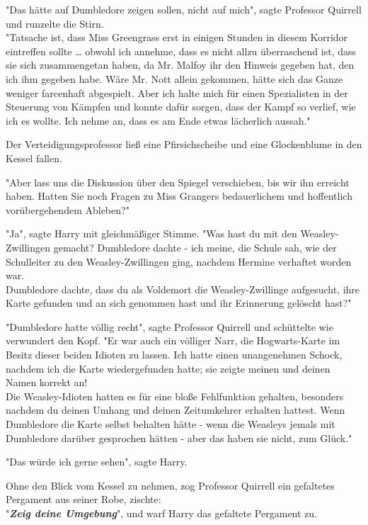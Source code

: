 {"Das hätte auf Dumbledore zeigen sollen, nicht auf mich", sagte Professor Quirrell und runzelte die Stirn.\\ "Tatsache ist, dass Miss Greengrass erst in einigen Stunden in diesem Korridor eintreffen sollte … obwohl ich annehme, dass es nicht allzu überraschend ist, dass sie sich zusammengetan haben, da Mr. Malfoy ihr den Hinweis gegeben hat, den ich ihm gegeben habe. Wäre Mr. Nott allein gekommen, hätte sich das Ganze weniger farcenhaft abgespielt. Aber ich halte mich für einen Spezialisten in der Steuerung von Kämpfen und konnte dafür sorgen, dass der Kampf so verlief, wie ich es wollte. Ich nehme an, dass es am Ende etwas lächerlich aussah."

Der Verteidigungsprofessor ließ eine Pfirsichscheibe und eine Glockenblume in den Kessel fallen.

"Aber lass uns die Diskussion über den Spiegel verschieben, bis wir ihn erreicht haben. Hatten Sie noch Fragen zu Miss Grangers bedauerlichem und hoffentlich vorübergehendem Ableben?"

"Ja", sagte Harry mit gleichmäßiger Stimme. "Was hast du mit den Weasley-Zwillingen gemacht? Dumbledore dachte - ich meine, die Schule sah, wie der Schulleiter zu den Weasley-Zwillingen ging, nachdem Hermine verhaftet worden war.\\ Dumbledore dachte, dass du als Voldemort die Weasley-Zwillinge aufgesucht, ihre Karte gefunden und an sich genommen hast und ihr Erinnerung gelöscht hast?"

"Dumbledore hatte völlig recht", sagte Professor Quirrell und schüttelte wie verwundert den Kopf. "Er war auch ein völliger Narr, die Hogwarts-Karte im Besitz dieser beiden Idioten zu lassen. Ich hatte einen unangenehmen Schock, nachdem ich die Karte wiedergefunden hatte; sie zeigte meinen und deinen Namen korrekt an!\\ Die Weasley-Idioten hatten es für eine bloße Fehlfunktion gehalten, besonders nachdem du deinen Umhang und deinen Zeitumkehrer erhalten hattest. Wenn Dumbledore die Karte selbst behalten hätte - wenn die Weasleys jemals mit Dumbledore darüber gesprochen hätten - aber das haben sie nicht, zum Glück."

"Das würde ich gerne sehen", sagte Harry.

Ohne den Blick vom Kessel zu nehmen, zog Professor Quirrell ein gefaltetes Pergament aus seiner Robe, zischte:\\ "\textbf{\emph{Zeig deine Umgebung}}", und warf Harry das gefaltete Pergament zu.

}
